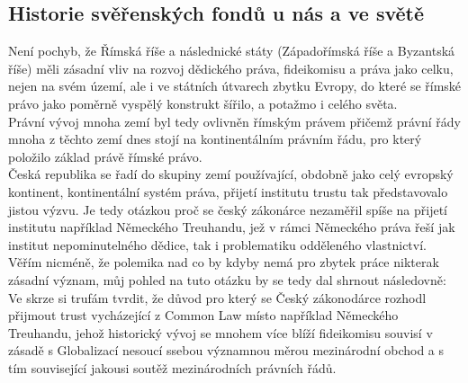 \documentclass{article}
\begin{document}



\subsection{Historie svěřenských fondů u nás a ve světě}

Není pochyb, že Římská říše a následnické státy (Západořímská říše a Byzantská říše) měli zásadní vliv na rozvoj dědického práva, fideikomisu a práva jako celku, nejen na svém území, ale i ve státních útvarech zbytku Evropy, do které se římské právo jako poměrně vyspělý konstrukt šířilo, a potažmo i celého světa.\\

 Právní vývoj mnoha zemí byl tedy ovlivněn římským právem přičemž právní řády mnoha z těchto zemí dnes stojí na kontinentálním právním řádu, pro který položilo základ právě římské právo.\\

 Česká republika se řadí do skupiny zemí používající, obdobně jako celý evropský kontinent, kontinentální systém práva, přijetí institutu trustu tak představovalo jistou výzvu. Je tedy otázkou proč se český zákonárce nezaměřil spíše na přijetí institutu například Německého Treuhandu, jež v rámci Německého práva řeší jak institut nepominutelného dědice, tak i problematiku odděleného vlastnictví. Věřím nicméně, že polemika nad co by kdyby nemá pro zbytek práce nikterak zásadní význam, můj pohled na tuto otázku by se tedy dal shrnout následovně: Ve skrze si trufám tvrdit, že důvod pro který se Český zákonodárce rozhodl přijmout trust vycházející z Common Law místo například Německého Treuhandu, jehož historický vývoj se mnohem více blíží fideikomisu souvisí v zásadě s Globalizací nesoucí ssebou významnou měrou mezinárodní obchod a s tím související jakousi soutěž mezinárodních právních řádů.\\
 
\end{document}
